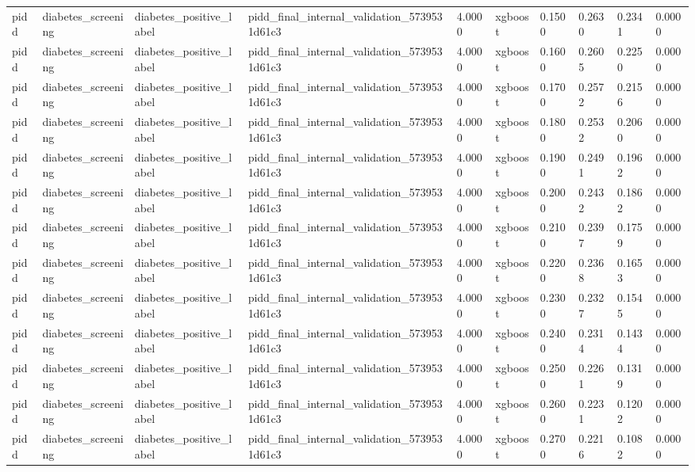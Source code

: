 \begin{tabular}{llllllllll}
pidd & diabetes\_screening & diabetes\_positive\_label & pidd\_final\_internal\_validation\_5739531d61c3 & 4.0000 & xgboost & 0.1500 & 0.2630 & 0.2341 & 0.0000 \\
pidd & diabetes\_screening & diabetes\_positive\_label & pidd\_final\_internal\_validation\_5739531d61c3 & 4.0000 & xgboost & 0.1600 & 0.2605 & 0.2250 & 0.0000 \\
pidd & diabetes\_screening & diabetes\_positive\_label & pidd\_final\_internal\_validation\_5739531d61c3 & 4.0000 & xgboost & 0.1700 & 0.2572 & 0.2156 & 0.0000 \\
pidd & diabetes\_screening & diabetes\_positive\_label & pidd\_final\_internal\_validation\_5739531d61c3 & 4.0000 & xgboost & 0.1800 & 0.2532 & 0.2060 & 0.0000 \\
pidd & diabetes\_screening & diabetes\_positive\_label & pidd\_final\_internal\_validation\_5739531d61c3 & 4.0000 & xgboost & 0.1900 & 0.2491 & 0.1962 & 0.0000 \\
pidd & diabetes\_screening & diabetes\_positive\_label & pidd\_final\_internal\_validation\_5739531d61c3 & 4.0000 & xgboost & 0.2000 & 0.2432 & 0.1862 & 0.0000 \\
pidd & diabetes\_screening & diabetes\_positive\_label & pidd\_final\_internal\_validation\_5739531d61c3 & 4.0000 & xgboost & 0.2100 & 0.2397 & 0.1759 & 0.0000 \\
pidd & diabetes\_screening & diabetes\_positive\_label & pidd\_final\_internal\_validation\_5739531d61c3 & 4.0000 & xgboost & 0.2200 & 0.2368 & 0.1653 & 0.0000 \\
pidd & diabetes\_screening & diabetes\_positive\_label & pidd\_final\_internal\_validation\_5739531d61c3 & 4.0000 & xgboost & 0.2300 & 0.2327 & 0.1545 & 0.0000 \\
pidd & diabetes\_screening & diabetes\_positive\_label & pidd\_final\_internal\_validation\_5739531d61c3 & 4.0000 & xgboost & 0.2400 & 0.2314 & 0.1434 & 0.0000 \\
pidd & diabetes\_screening & diabetes\_positive\_label & pidd\_final\_internal\_validation\_5739531d61c3 & 4.0000 & xgboost & 0.2500 & 0.2261 & 0.1319 & 0.0000 \\
pidd & diabetes\_screening & diabetes\_positive\_label & pidd\_final\_internal\_validation\_5739531d61c3 & 4.0000 & xgboost & 0.2600 & 0.2231 & 0.1202 & 0.0000 \\
pidd & diabetes\_screening & diabetes\_positive\_label & pidd\_final\_internal\_validation\_5739531d61c3 & 4.0000 & xgboost & 0.2700 & 0.2216 & 0.1082 & 0.0000 \\

\end{tabular}
